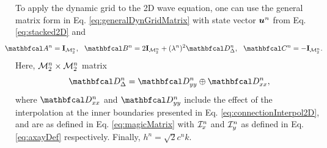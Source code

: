 \documentclass[fleqn]{jaes}
\begin{document}
To apply the dynamic grid to the 2D wave equation, one can use the general matrix form in Eq. \eqref{eq:generalDynGridMatrix} with state vector $\boldsymbol{u}^n$ from Eq. \eqref{eq:stacked2D} and
\begin{equation}\label{eq:2DwaveDynMatrix}
    \!\!\!\!\!\!\!\!\!\AA = \I_\MtwoD, \ \ \BB = 2\I_\MtwoD + (\lambda^n)^2\DDDelta,\ \ \CC = -\I_\MtwoD.
\end{equation}
Here,
${\mathcal{M}_2^n} \times {\mathcal{M}_2^n}$ matrix
\begin{equation}\label{eq:dynamicKronecker}
    \DDDelta = \DDyy \oplus \DDxx,
\end{equation}
where $\DDxx$ and $\DDyy$ include the effect of the interpolation at the inner boundaries presented in Eq. \eqref{eq:connectionInterpol2D}, and are as defined in Eq. \eqref{eq:magicMatrix} with $\mathcal{I}^n_x$ and $\mathcal{I}^n_y$ as defined in Eq. \eqref{eq:axayDef} respectively. Finally, $h^n = \sqrt{2}c^n k$.
\end{document}
